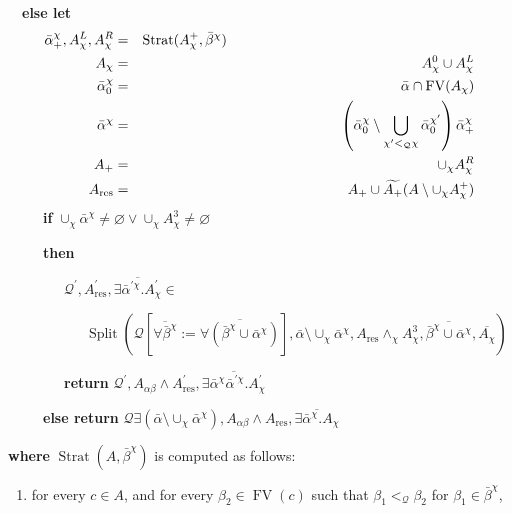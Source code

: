\documentclass{article}
\newcommand{\assign}{:=}
\newcommand{\tmop}[1]{\ensuremath{\operatorname{#1}}}
\newcommand{\tmstrong}[1]{\textbf{#1}}
\begin{document}
\begin{table}[t]
  \ \ {\tmstrong{else let}}
  \begin{eqnarray*}
    \bar{\alpha}_+^{\chi}, A_{\chi}^L, A^R_{\chi} & = & \tmop{Strat}
    (A^+_{\chi}, \bar{\beta}^{\chi}) \text{ \ \ \ \ \ \ \ \ \ \ \ \ \ \ \ \ \
    \ \ \ \ \ \ \ \ \ \ \ \ \ \ \ \ \ \ \ \ \ \ \ \ \ \ \ \ \ \ \ \ \ \ \ }\\
    A_{\chi} & = & A_{\chi}^0 \cup A_{\chi}^L\\
    \bar{\alpha}^{\chi}_0 & = & \bar{\alpha} \cap \tmop{FV} (A_{\chi})\\
    \bar{\alpha}^{\chi} & = & \left( \bar{\alpha}^{\chi}_0 \setminus
    \bigcup_{\chi^{\prime} <_{\mathcal{Q}} \chi}
    \bar{\alpha}^{\chi^{\prime}}_0 \right) \bar{\alpha}_+^{\chi}\\
    A_+ & = & \cup_{\chi} A_{\chi}^R\\
    A_{\tmop{res}} & = & A_+ \cup \widetilde{A_+} (A \setminus \cup_{\chi}
    A_{\chi}^+)
  \end{eqnarray*}
  \ \ \ \ \ {\tmstrong{if}} $\cup_{\chi} \bar{\alpha}^{\chi} \neq \varnothing
  \vee \cup_{\chi} A^3_{\chi} \neq \varnothing$
  
  \ \ \ \ \ {\tmstrong{then}}
  
  \ \ \ \ \ \ \ \ $\mathcal{Q}^{\prime}, A_{\tmop{res}}^{\prime},
  \overline{\exists \bar{\alpha}^{\prime \chi} .A_{\chi}^{\prime}} \in$
  
  \ \ \ \ \ \ \ \ \ \ \ $\tmop{Split} (\mathcal{Q} [\overline{\forall
  \bar{\beta}^{\chi}} \assign \overline{\forall (\bar{\beta}^{\chi} \cup
  \bar{\alpha}^{\chi})}], \bar{\alpha} \setminus \cup_{\chi}
  \bar{\alpha}^{\chi}, A_{\tmop{res}} \wedge_{\chi} A^3_{\chi},
  \overline{\bar{\beta}^{\chi} \cup \bar{\alpha}^{\chi}},
  \overline{A_{\chi}})$
  
  \ \ \ \ \ \ \ \ {\tmstrong{return}} $\mathcal{Q}^{\prime}, A_{\alpha \beta}
  \wedge A_{\tmop{res}}^{\prime}, \overline{\exists \bar{\alpha}^{\chi}
  \bar{\alpha}^{\prime \chi} .A_{\chi}^{\prime}}$
  
  \ \ \ \ \ {\tmstrong{else return}} $\mathcal{Q} \exists (\bar{\alpha}
  \setminus \cup_{\chi} \bar{\alpha}^{\chi}), A_{\alpha \beta} \wedge
  A_{\tmop{res}}, \overline{\exists \bar{\alpha}^{\chi} .A_{\chi}}$
  
  {\tmstrong{where}} $\tmop{Strat} (A, \bar{\beta}^{\chi})$ is computed as
  follows:
  \begin{enumerate}
    \item for every $c \in A$, and for every $\beta_2 \in \tmop{FV} (c)$ such
    that $\beta_1 <_{\mathcal{Q}} \beta_2$ for $\beta_1 \in
    \bar{\beta}^{\chi}$,
    

\end{enumerate}
\end{table}
\end{document}
